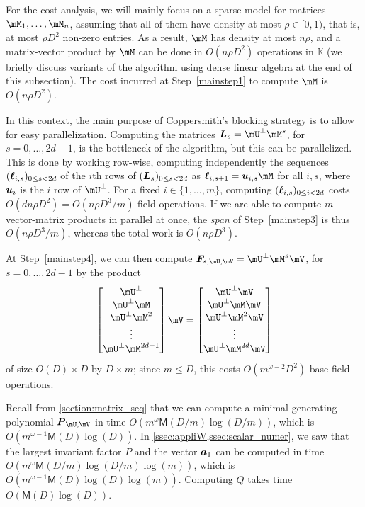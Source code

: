 \documentclass[12pt]{article}
\newcommand{\mat}[1]{\bm{\MakeUppercase{#1}}} %
\newcommand{\row}[1]{\bm{\MakeLowercase{#1}}} %
\newcommand{\seqelt}[1]{\bm{F}_{#1}} %
\newcommand{\sqfree}{Q}
\newcommand{\density}{\rho}
\def\M {\ensuremath{\mathsf{M}}}
\def\K{\mathbb{K}}
\def\K {\ensuremath{\mathbb{K}}}
\begin{document}
For the cost analysis, we will mainly focus on a sparse model for
matrices $\mM_1,\dots,\mM_n$, assuming that all of them have density
at most $\density \in [0,1)$, that is, at most $\density D^2$ non-zero entries.  
As a result, $\mM$ has density at most $n\density$, and a matrix-vector product
by $\mM$ can be done in $O(n\density D^2)$ operations in $\K$ (we briefly
discuss variants of the algorithm using dense linear algebra at the
end of this subsection). The cost incurred at Step~\ref{mainstep1}
to compute $\mM$ is $O(n\density D^2)$.

In this context, the main purpose of Coppersmith's blocking strategy
is to allow for easy parallelization. Computing the matrices
$\mat{L}_s=\mU^{\perp}\mM^s$, for $s=0,\dots,2d-1$, is the bottleneck
of the algorithm, but this can be parallelized. This is done by
working row-wise, computing independently the sequences
$(\row{\ell}_{i,s})_{0 \le s < 2d}$ of the $i$th rows of
$(\mat{L}_s)_{0 \le s < 2d}$ as $\row{\ell}_{i,s+1} = \row{u}_{i,s}
\mM$ for all $i,s$, where $\row{u}_i$ is the $i$ row of $\mU^\perp$.
For a fixed $i \in \{1,\dots,m\}$, computing $(\mat{\ell}_{i,s})_{0
  \le i < 2d}$ costs $O(dn \density D^2) = O(n\density D^3/m )$ field operations. If
we are able to compute $m$ vector-matrix products in parallel at once,
the {\em span} of Step~\ref{mainstep3} is thus $O(n\density D^3/m)$, whereas
the total work is $O(n\density D^3)$.

At Step~\ref{mainstep4}, we can then compute $\seqelt{s,\mU,\mV}=\mU^{\perp}\mM^s\mV$, for $s=0,\dots,2d-1$ by the
product
$$
\begin{bmatrix}
\mU^{\perp}\\
\mU^{\perp} \mM\\
\mU^{\perp} \mM^2\\
\vdots\\
\mU^{\perp} \mM^{2d-1}\\
\end{bmatrix} \mV
= 
\begin{bmatrix}
\mU^{\perp} \mV\\
\mU^{\perp} \mM \mV\\
\mU^{\perp} \mM^2 \mV\\
\vdots \\
\mU^{\perp} \mM^{2d} \mV\\
\end{bmatrix}
$$
of size $O(D) \times D$ by $D \times m$; since $m \le D$, this  costs $O(m^{\omega-2}D^2)$
base field operations.

Recall from \cref{section:matrix_seq} that we can compute a minimal
generating polynomial $\mat{P}_{\mU,\mV}$ in time $O(m^{\omega}
\M(D/m) \log(D/m))$, which is $O(m^{\omega-1} \M(D) \log(D))$.  In
\cref{ssec:appliW,ssec:scalar_numer}, we saw that the
largest invariant factor $P$ and the vector $\row{a}_1$ can be
computed in time $O(m^{\omega} \M(D/m) \log(D/m) \log(m))$, which is
$O(m^{\omega-1} \M(D) \log(D)\log(m))$.  Computing $\sqfree$ takes time
$O(\M(D) \log(D))$.
\end{document}
